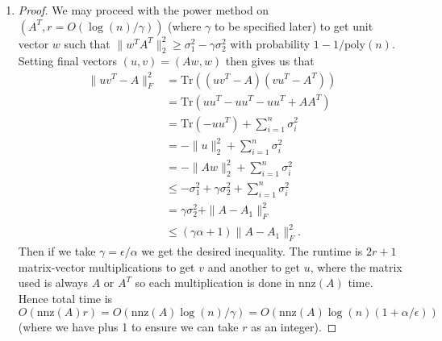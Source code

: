 \documentclass[11pt]{article}
\begin{document}
\begin{enumerate}[1.]
\begin{enumerate}[(a)]
\begin{proof}
\begin{align*}
&\ge \sigma_1^2 - \sigma_2^2 (\gamma/2 + \gamma/2)\\
&= \sigma_1^2 - \gamma \sigma_2^2.
\end{align*}
We're done.
\end{proof}
\end{enumerate}
\item \begin{proof}
We may proceed with the power method on $(A^T, r = O(\log(n)/\gamma))$ (where $\gamma$ to be specified later) to get unit vector $w$ such that $\|w^T A^T\|_2^2 \ge \sigma_1^2 - \gamma \sigma_2^2$ with probability $1 - 1/\text{poly}(n)$. Setting final vectors $(u,v) = (Aw, w)$ then gives us that
\begin{align*}
  \|uv^T - A\|_F^2 &= \text{Tr}\left((uv^T - A)(vu^T - A^T)\right)\\
  &= \text{Tr}\left(uu^T - uu^T - uu^T + AA^T\right)\\
  &= \text{Tr}\left(-uu^T\right) + \sum_{i=1}^n \sigma_i^2\\
  &= -\|u\|_2^2 + \sum_{i=1}^n \sigma_i^2\\
  &= -\|Aw\|_2^2 + \sum_{i=1}^n \sigma_i^2\\
  &\le - \sigma_1^2 + \gamma \sigma_2^2 + \sum_{i=1}^n \sigma_i^2\\
  &= \gamma \sigma_2^2 + \|A - A_1\|_F^2\\
  &\le (\gamma \alpha + 1) \|A - A_1\|_F^2.
\end{align*}
Then if we take $\gamma = \epsilon / \alpha$ we get the desired inequality. The runtime is $2r+1$ matrix-vector multiplications to get $v$ and another to get $u$, where the matrix used is always $A$ or $A^T$ so each multiplication is done in $\text{nnz}(A)$ time. Hence total time is $O(\text{nnz}(A)r) = O(\text{nnz}(A)\log(n)/\gamma) = O(\text{nnz}(A)\log(n)(1 + \alpha/\epsilon))$ (where we have plus 1 to ensure we can take $r$ as an integer).
\end{proof}
\end{enumerate}
\end{document}
